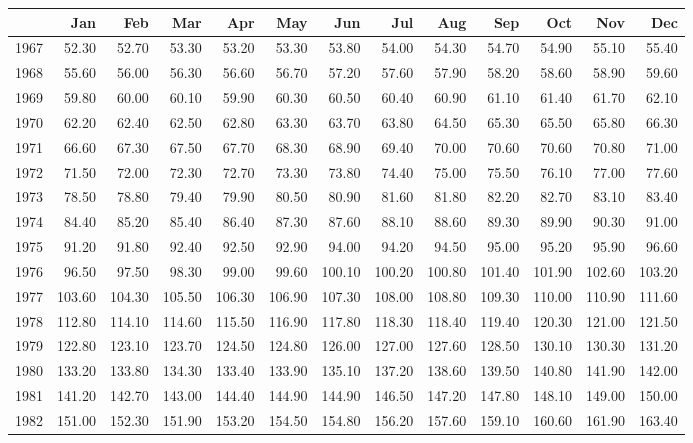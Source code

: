\begin{longtable}{rrrrrrrrrrrrr}
  \hline
 & Jan & Feb & Mar & Apr & May & Jun & Jul & Aug & Sep & Oct & Nov & Dec \\ 
  \hline
1967 & 52.30 & 52.70 & 53.30 & 53.20 & 53.30 & 53.80 & 54.00 & 54.30 & 54.70 & 54.90 & 55.10 & 55.40 \\ 
  1968 & 55.60 & 56.00 & 56.30 & 56.60 & 56.70 & 57.20 & 57.60 & 57.90 & 58.20 & 58.60 & 58.90 & 59.60 \\ 
  1969 & 59.80 & 60.00 & 60.10 & 59.90 & 60.30 & 60.50 & 60.40 & 60.90 & 61.10 & 61.40 & 61.70 & 62.10 \\ 
  1970 & 62.20 & 62.40 & 62.50 & 62.80 & 63.30 & 63.70 & 63.80 & 64.50 & 65.30 & 65.50 & 65.80 & 66.30 \\ 
  1971 & 66.60 & 67.30 & 67.50 & 67.70 & 68.30 & 68.90 & 69.40 & 70.00 & 70.60 & 70.60 & 70.80 & 71.00 \\ 
  1972 & 71.50 & 72.00 & 72.30 & 72.70 & 73.30 & 73.80 & 74.40 & 75.00 & 75.50 & 76.10 & 77.00 & 77.60 \\ 
  1973 & 78.50 & 78.80 & 79.40 & 79.90 & 80.50 & 80.90 & 81.60 & 81.80 & 82.20 & 82.70 & 83.10 & 83.40 \\ 
  1974 & 84.40 & 85.20 & 85.40 & 86.40 & 87.30 & 87.60 & 88.10 & 88.60 & 89.30 & 89.90 & 90.30 & 91.00 \\ 
  1975 & 91.20 & 91.80 & 92.40 & 92.50 & 92.90 & 94.00 & 94.20 & 94.50 & 95.00 & 95.20 & 95.90 & 96.60 \\ 
  1976 & 96.50 & 97.50 & 98.30 & 99.00 & 99.60 & 100.10 & 100.20 & 100.80 & 101.40 & 101.90 & 102.60 & 103.20 \\ 
  1977 & 103.60 & 104.30 & 105.50 & 106.30 & 106.90 & 107.30 & 108.00 & 108.80 & 109.30 & 110.00 & 110.90 & 111.60 \\ 
  1978 & 112.80 & 114.10 & 114.60 & 115.50 & 116.90 & 117.80 & 118.30 & 118.40 & 119.40 & 120.30 & 121.00 & 121.50 \\ 
  1979 & 122.80 & 123.10 & 123.70 & 124.50 & 124.80 & 126.00 & 127.00 & 127.60 & 128.50 & 130.10 & 130.30 & 131.20 \\ 
  1980 & 133.20 & 133.80 & 134.30 & 133.40 & 133.90 & 135.10 & 137.20 & 138.60 & 139.50 & 140.80 & 141.90 & 142.00 \\ 
  1981 & 141.20 & 142.70 & 143.00 & 144.40 & 144.90 & 144.90 & 146.50 & 147.20 & 147.80 & 148.10 & 149.00 & 150.00 \\ 
  1982 & 151.00 & 152.30 & 151.90 & 153.20 & 154.50 & 154.80 & 156.20 & 157.60 & 159.10 & 160.60 & 161.90 & 163.40 \\ 

\end{longtable}
